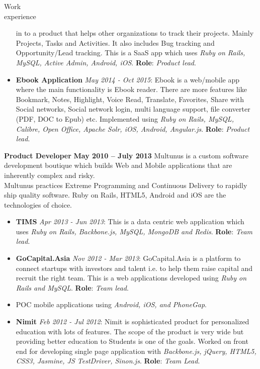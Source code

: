 \documentclass{resume}
\begin{document}
\begin{category}{Work \\experience}
\begin{itemize}
    in to a product that helps other    organizations to track their
    projects. Mainly Projects, Tasks and Activities. It also includes
    Bug tracking and Opportunity/Lead tracking. This is a SaaS app
    which uses {\em Ruby on Rails, MySQL, Active Admin, Android, iOS}. \textbf{Role}: {\em Product lead}. 
  \item \textbf{Ebook Application} {\em May 2014 - Oct 2015}: Ebook is
    a web/mobile app where the main functionality is Ebook
    reader. There are more features like Bookmark, Notes, Highlight,
    Voice Read, Translate, Favorites, Share with Social networks,
    Social network login, multi language support, file converter (PDF,
    DOC to Epub) etc. Implemented using {\em Ruby on Rails, MySQL,
      Calibre, Open Office, Apache Solr, iOS, Android,
      Angular.js}. \textbf{Role}: {\em Product lead}. 
  \end{itemize}
  \citemnobullet \textbf{Product Developer} \hfill \textbf{May 2010 -- July 2013}
  \citemnobullet Multunus is a custom software development boutique
  which builds Web and Mobile applications that are inherently
  complex and risky.\\Multunus practices Extreme Programming and Continuous
  Delivery to rapidly ship quality software. Ruby on Rails, HTML5, Android and iOS are the technologies of choice.
  \begin{itemize}
  \item \textbf{TIMS} {\em Apr 2013 - Jun 2013}: This is a data centric web application which uses {\em Ruby on Rails, Backbone.js, MySQL, MongoDB and Redis}. \textbf{Role}: {\em Team lead}. 
  \item \textbf{GoCapital.Asia} {\em Nov 2012 - Mar 2013}: GoCapital.Asia is a
    platform to connect startups with investors and talent i.e. to
    help them raise capital and recruit the right team. This is a web
    applications developed using {\em Ruby on Rails and MySQL}. \textbf{Role}:
    {\em Team lead}.
  \item POC mobile applications using {\em Android, iOS, and PhoneGap}.
  \item \textbf{Nimit} {\em Feb 2012 - Jul 2012}: Nimit is sophisticated
    product for personalized education with lots of features. The
    scope of the product is very wide but providing better education
    to Students is one of the goals. Worked on front end for
    developing single page application with {\em Backbone.js, jQuery,
      HTML5, CSS3, Jasmine, JS TestDriver, Sinon.js}. \textbf{Role}: {\em Team Lead}.

\end{itemize}
\end{category}
\end{document}
